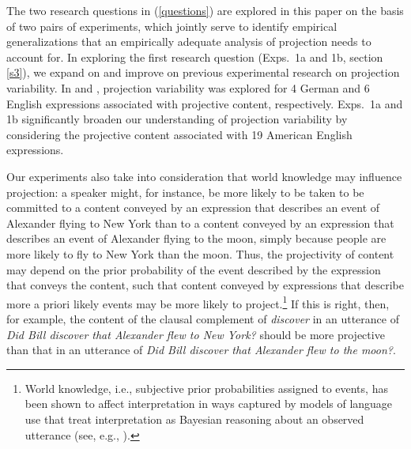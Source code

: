 \documentclass[11pt,fleqn]{article}
\newcommand{\6}{\mbox{$[\hspace*{-.6mm}[$}}
\newcommand{\9}{\mbox{$]\hspace*{-.6mm}]$}}
\begin{document}
The two research questions in (\ref{questions}) are explored in this paper on the basis of two pairs of experiments, which jointly serve to identify empirical generalizations that an empirically adequate analysis of projection needs to account for. In exploring the first research question (Exps.~1a and 1b, section \ref{s3}), we expand on and improve on previous experimental research on projection variability. In \citealt{xue-onea11} and \citealt{smith-hall11}, projection variability was explored for 4 German and 6 English expressions associated with projective content, respectively. Exps.~1a and 1b significantly broaden our understanding of projection variability by considering the projective content associated with 19 American English expressions. 

Our experiments also take into consideration that world knowledge may influence projection: a speaker might, for instance, be more likely to be taken to be committed to a content conveyed by an expression that describes an event of Alexander flying to New York than to a content conveyed by an expression that describes an event of Alexander flying to the moon, simply because people are more likely to fly to New York than the moon. Thus, the projectivity of content may depend on the prior probability of the event described by the expression that conveys the content, such that content conveyed by expressions that describe more a priori likely events may be more likely to project.\footnote{World knowledge, i.e., subjective prior probabilities assigned to events, has been shown to affect interpretation in ways captured by models of language use that treat interpretation as Bayesian reasoning about an observed utterance (see, e.g., \citealt{frankejaeger2016, goodmanfrank2016}).} If this is right, then, for example, the content of the clausal complement of {\em discover} in an utterance of {\em Did Bill discover that Alexander flew to New York?} should be more projective than that in an utterance of {\em Did Bill discover that Alexander flew to the moon?}. 
\end{document}
